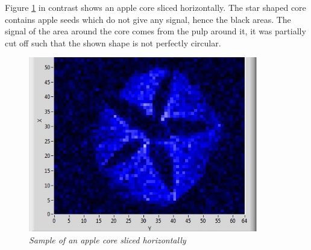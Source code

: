 \noindent
Figure \ref{fig:18} in contrast shows an apple core sliced horizontally. The star shaped core contains apple seeds which do not give any signal, hence the black areas. The signal of the area around the core comes from the pulp around it, it was partially cut off such that the shown shape is not perfectly circular.
\begin{figure}[h]
	\includegraphics[width=100mm]{Apple}
	\centering
	\caption{\itshape Sample of an apple core sliced horizontally}
	\label{fig:18}
\end{figure}